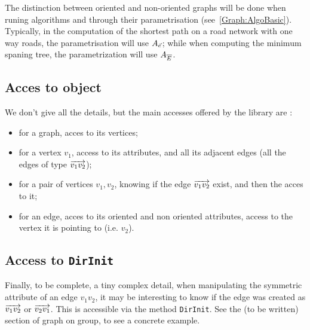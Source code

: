 The distinction between oriented and non-oriented graphs will be done when runing algorithms and through their
parametrisation (see~\ref{Graph:AlgoBasic}). Typically, in the computation of the shortest path on a road network
with one way roads, the parametrisation will use $A_{\vec{e}}$; while when computing the minimum spaning tree, 
the parametrization will use  $A_{\overline{E}}$.


\subsection{Acces to object}

We don't give all the details, but the main accesses offered by the library are :

\begin{itemize}
    \item for a graph, acces to its vertices;

    \item for a vertex $v_1$, access to its attributes, and all its adjacent edges
          (all the edges of type  $\overrightarrow{v_1 v_2}$);

    \item for a pair of vertices $v_1,v_2$, knowing if the edge $\overrightarrow{v_1 v_2}$ exist,
          and then the acces to it;

    \item for an edge, acces to its oriented and non oriented attributes, access to the vertex it is pointing to (i.e. $v_2$).
\end{itemize}



\subsection{Access to {\tt DirInit}}

Finally, to be complete, a tiny complex detail, when manipulating the symmetric
attribute of an edge $v_1v_2$, it may be interesting to know if the edge  was  created as $\overrightarrow{v_1 v_2}$
or $\overrightarrow{v_2 v_1}$. This is accessible via the method {\tt DirInit}.  See the (to
be written) section of graph on group, to see a concrete example.



